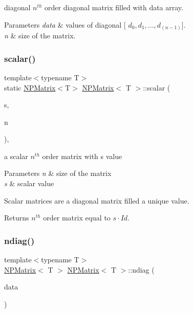 diagonal $ n^{th} $ order diagonal matrix filled with data array. 


\begin{DoxyParams}{Parameters}
{\em data} & values of diagonal {\ttfamily \mbox{[}} $ d_0, d_1, ..., d_{(n-1)} ${\ttfamily \mbox{]}}. \\
\hline
{\em n} & size of the matrix. \\
\hline
\end{DoxyParams}
\mbox{\label{class_n_p_matrix_a3195b8dd4a279c3018122c3053997f8c}} 
\subsubsection{\texorpdfstring{scalar()}{scalar()}}
{\footnotesize\ttfamily template$<$typename T$>$ \\
static \mbox{\hyperlink{class_n_p_matrix}{N\+P\+Matrix}}$<$T$>$ \mbox{\hyperlink{class_n_p_matrix}{N\+P\+Matrix}}$<$ T $>$\+::scalar (\begin{DoxyParamCaption}\item[{T}]{s,  }\item[{\mbox{\hyperlink{typedef_8h_a1b140a2034db3f5dfe18a987745df43a}{ul\+\_\+t}}}]{n }\end{DoxyParamCaption})\hspace{0.3cm}{\ttfamily [inline]}, {\ttfamily [static]}}



a scalar $ n^{th} $ order matrix with {\ttfamily s} value 


\begin{DoxyParams}{Parameters}
{\em n} & size of the matrix \\
\hline
{\em s} & scalar value\\
\hline
\end{DoxyParams}
Scalar matrices are a diagonal matrix filled a unique value. \begin{DoxyReturn}{Returns}
$ n^{th} $ order matrix equal to $ s \cdot Id $. 
\end{DoxyReturn}
\mbox{\label{class_n_p_matrix_a16aa6a18c33005300049ab1a39cbfbc2}} 
\subsubsection{\texorpdfstring{ndiag()}{ndiag()}}
{\footnotesize\ttfamily template$<$typename T$>$ \\
\mbox{\hyperlink{class_n_p_matrix}{N\+P\+Matrix}}$<$ T $>$ \mbox{\hyperlink{class_n_p_matrix}{N\+P\+Matrix}}$<$ T $>$\+::ndiag (\begin{DoxyParamCaption}\item[{const std\+::vector$<$ \mbox{\hyperlink{class_n_vector}{N\+Vector}}$<$ T $>$ $>$ \&}]{data }\end{DoxyParamCaption})\hspace{0.3cm}{\ttfamily [static]}}



